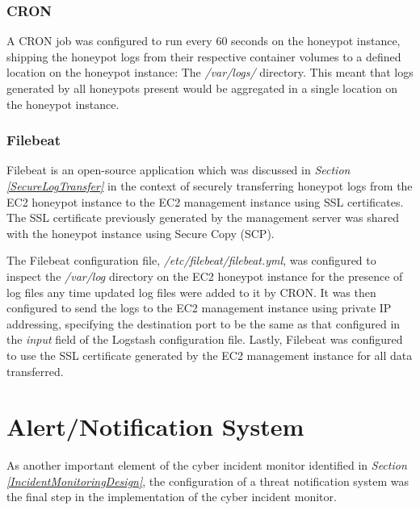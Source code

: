 	\subsubsection{CRON \label{CRON}}
		
		A CRON job was configured to run every 60 seconds on the honeypot instance, shipping the honeypot logs from their respective container volumes to a defined location on the honeypot instance: The \textit{/var/logs/} directory. This meant that logs generated by all honeypots present would be aggregated in a single location on the honeypot instance.
        

	\subsubsection{Filebeat}
    Filebeat is an open-source application which was discussed in \textit{Section \ref{SecureLogTransfer}} in the context of securely transferring honeypot logs from the EC2 honeypot instance to the EC2 management instance using SSL certificates. The SSL certificate previously generated by the management server was shared with the honeypot instance using Secure Copy (SCP).
        
    The Filebeat configuration file, \textit{/etc/filebeat/filebeat.yml}, was configured to inspect the \textit{/var/log} directory on the EC2 honeypot instance for the presence of log files any time updated log files were added to it by CRON. It was then configured to send the logs to the EC2 management instance using private IP addressing, specifying the destination port to be the same as that configured in the \textit{input} field of the Logstash configuration file. Lastly, Filebeat was configured to use the SSL certificate generated by the EC2 management instance for all data transferred.


\section{Alert/Notification System}\label{AlertSystemSection}
As another important element of the cyber incident monitor identified in \textit{Section \ref{IncidentMonitoringDesign}}, the configuration of a threat notification system was the final step in the implementation of the cyber incident monitor.

